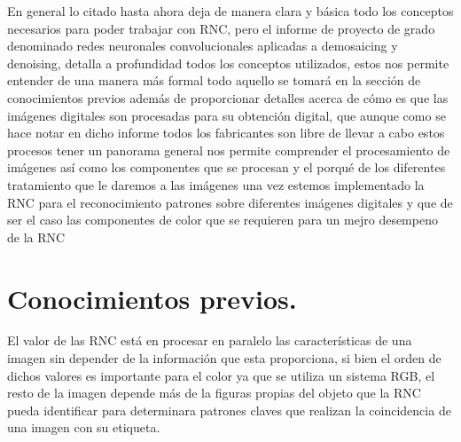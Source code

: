 \documentclass[a4paper, 12pt]{article}
\begin{document}
    En general lo citado hasta ahora deja de manera clara y básica todo los conceptos necesarios para poder trabajar con RNC, pero el informe de proyecto de grado denominado redes neuronales convolucionales aplicadas a demosaicing y denoising, detalla a profundidad todos los conceptos utilizados, estos nos permite entender de una manera más formal todo aquello se tomará en la sección de conocimientos previos además de proporcionar detalles acerca de cómo es que las imágenes digitales son procesadas para su obtención digital, que aunque como se hace notar en dicho informe todos los fabricantes son libre de llevar a cabo estos  procesos tener un panorama general nos permite comprender el procesamiento de imágenes así como los componentes que se procesan y el porqué de los diferentes tratamiento que le daremos a las imágenes una vez estemos implementado la RNC para el reconocimiento patrones sobre diferentes imágenes digitales y que de ser el caso las componentes de color que se requieren para un mejro desempeno de la RNC\cite{balduvin2019redes}

    \section{Conocimientos previos.}
    El valor de las RNC está en procesar en paralelo las características de una imagen sin depender de la información que esta proporciona, si bien el orden de dichos valores es importante para el color ya que se utiliza un sistema RGB, el resto de la imagen depende más de la figuras propias del objeto que la RNC pueda identificar para determinara patrones claves que realizan la coincidencia de una imagen con su etiqueta.
\end{document}
